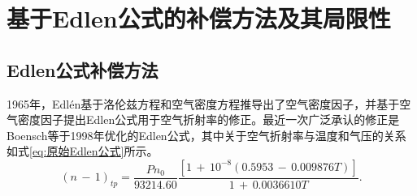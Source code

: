 \section{基于Edlen公式的补偿方法及其局限性}
\subsection{Edlen公式补偿方法}
1965年，Edlén基于洛伦兹方程和空气密度方程推导出了空气密度因子，并基于空气密度因子提出Edlen公式用于空气折射率的修正\cite{2015Refractive}。最近一次广泛承认的修正是Boensch等\cite{1998Fit}于1998年优化的Edlen公式，其中关于空气折射率与温度和气压的关系如式\eqref{eq:原始Edlen公式}所示。
    \begin{equation}\label{eq:原始Edlen公式}
    (n\,-\,1)_{tp}=\frac{Pn_0}{93214.60}\frac{[1\,+\,10^{-8}(0.5953\,-\,0.009876T)]}{1\,+\,0.0036610T}.
    \end{equation}

